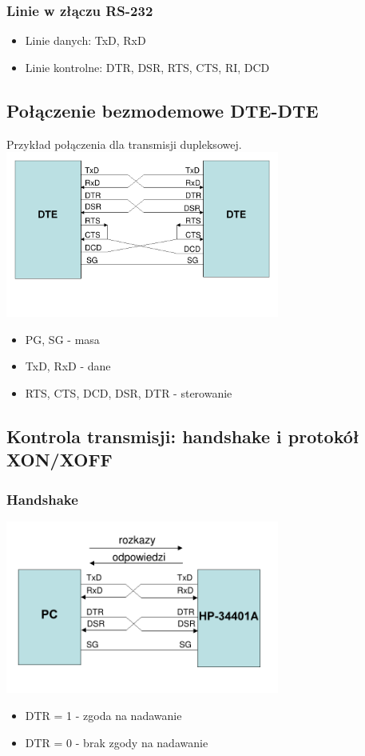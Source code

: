\documentclass[a4paper,twoside]{article}
\begin{document}
		\subsubsection{Linie w złączu RS-232}
		\begin{itemize}
			\item Linie danych: TxD, RxD
			\item Linie kontrolne: DTR, DSR, RTS, CTS, RI, DCD
		\end{itemize}
	\subsection{Połączenie bezmodemowe DTE-DTE}
	Przykład połączenia dla transmisji dupleksowej.\\
	\includegraphics[width=9cm]{./wyklady/RS232_7_1.pdf}
	\begin{itemize}
		\item PG, SG - masa
		\item TxD, RxD - dane
		\item RTS, CTS, DCD, DSR, DTR - sterowanie
	\end{itemize}
	\subsection{Kontrola transmisji: handshake i protokół XON/XOFF}
		\subsubsection{Handshake}
		\includegraphics[width=9cm]{./wyklady/RS232_9_1.pdf}
		\begin{itemize}
			\item DTR = 1 - zgoda na nadawanie
			\item DTR = 0 - brak zgody na nadawanie
		\end{itemize}
\end{document}
